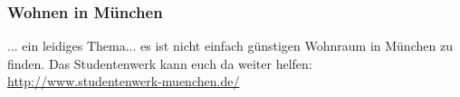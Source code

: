\subsubsection{Wohnen in München}
... ein leidiges Thema... es ist nicht einfach günstigen Wohnraum in 
München zu finden. Das Studentenwerk kann euch da weiter helfen: 
\url{http://www.studentenwerk-muenchen.de/} 